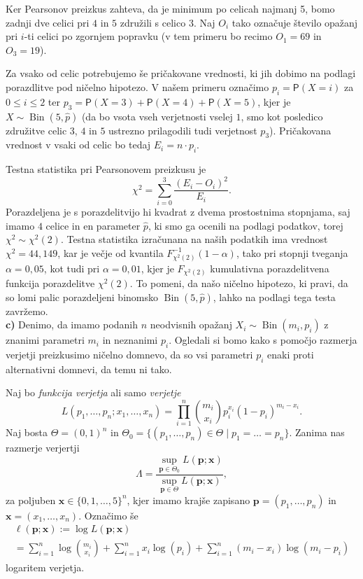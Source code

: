 \documentclass[a4paper,11pt]{article}
\newcommand{\sumin}{\sum_{i = 1}^n}
\newcommand{\inv}{^{-1}}
\DeclareMathOperator{\bin}{Bin}
\begin{document}
Ker Pearsonov preizkus zahteva, da je minimum po celicah najmanj 5, bomo zadnji dve celici pri $4$ in $5$ združili s celico $3$. Naj $O_i$ tako označuje število opažanj pri $i$-ti celici po zgornjem popravku (v tem primeru bo recimo $O_1 = 69$ in $O_3 = 19$). 

Za vsako od celic potrebujemo še pričakovane vrednosti, ki jih dobimo na podlagi porazdlitve pod ničelno hipotezo. V našem primeru označimo $p_i = \mathsf{P}(X = i)$ za $0 \leq i \leq 2$ ter $p_3 = \mathsf{P}(X = 3) + \mathsf{P}(X = 4) + \mathsf{P}(X = 5)$, kjer je $X \sim \bin(5, \hat{p})$ (da bo vsota vseh verjetnosti vselej $1$, smo kot posledico združitve celic $3$, $4$ in $5$ ustrezno prilagodili tudi verjetnost $p_3$). Pričakovana vrednost v vsaki od celic bo tedaj $E_i = n \cdot p_i$.

Testna statistika pri Pearsonovem preizkusu je 
\[
    \chi^2 = \sum_{i = 0}^3 \frac{(E_i - O_i)^2}{E_i}.
\]
Porazdeljena je s porazdelitvijo hi kvadrat z dvema prostostnima stopnjama, saj imamo $4$ celice in en parameter $\hat p$, ki smo ga ocenili na podlagi podatkov, torej $\chi^2 \sim \chi^2(2)$. Testna statistika izračunana na naših podatkih ima vrednost $\chi^2 = 44,149$, kar je večje od kvantila $F_{\chi^2(2)}\inv(1 - \alpha)$, tako pri stopnji tveganja $\alpha = 0,05$, kot tudi pri $\alpha = 0,01$, kjer je $F_{\chi^2(2)}$ kumulativna porazdelitvena funkcija porazdelitve $\chi^2(2)$. To pomeni, da našo ničelno hipotezo, ki pravi, da so lomi palic porazdeljeni binomsko $\bin(5, \hat{p})$, lahko na podlagi tega testa zavržemo.
\\

\noindent
\textbf{c)} Denimo, da imamo podanih $n$ neodvisnih opažanj $X_i \sim \bin(m_i, p_i)$ z znanimi parametri $m_i$ in neznanimi $p_i$. Ogledali si bomo kako s pomočjo razmerja verjetji preizkusimo ničelno domnevo, da so vsi parametri $p_i$ enaki proti alternativni domnevi, da temu ni tako. 

Naj bo \emph{funkcija verjetja} ali samo \emph{verjetje}
\[
    L(p_1, \ldots, p_n; x_1, \ldots, x_n)  = \prod_{i = 1}^n \binom{m_i}{x_i}p_i^{x_i} (1 - p_i)^{m_i - x_i}. 
\]
Naj bosta $\Theta = (0,1)^n$ in $\Theta_0 = \{(p_1, \ldots, p_n) \in \Theta \mid p_1 = \dots = p_n\}$. Zanima nas razmerje verjertji
\[
    \Lambda = \frac{\sup_{\bm{p} \in \Theta_0} L(\bm{p}; \bm{x})}{\sup_{\bm{p} \in \Theta} L(\bm{p}; \bm{x})},   
\]
za poljuben $\bm{x} \in \{0,1,\ldots, 5\}^n$, kjer imamo krajše zapisano $\bm{p} = (p_1, \ldots, p_n)$ in $\bm{x} = (x_1, \ldots, x_n)$. Označimo še 
\begin{multline*}
    \ell(\bm{p}; \bm{x}) := 
    \log L(\bm{p}; \bm{x}) \\ = 
    \sumin \log \binom{m_i}{x_i} + \sumin x_i \log(p_i) + \sumin (m_i - x_i) \log(m_i - p_i)
\end{multline*}
logaritem verjetja.
\end{document}
